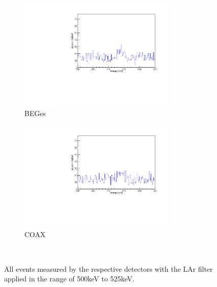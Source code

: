 \begin{figure}[t!]
\centering
\begin{subfigure}{0.5\textwidth}
	\includegraphics[width=75mm]{./Bilder/500525LArVetoBEGes.pdf}
    \caption{BEGes}
  \label{fig:LArBEGes}
\end{subfigure}%
\begin{subfigure}{0.5\textwidth}
	\includegraphics[width=75mm]{./Bilder/500525LArVetoCOAX.pdf}
  \caption{COAX}
  \label{fig:LArCOAX}
\end{subfigure}
    \\
	\vspace{0.5cm}
    \caption{All events measured by the respective detectors with the LAr filter applied in the range of 500keV to 525keV.}
\end{figure}

